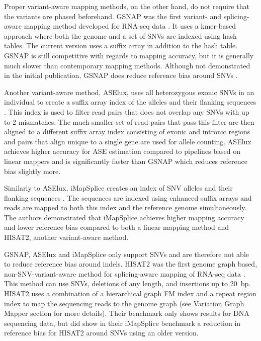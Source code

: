 Proper variant-aware mapping methods, on the other hand, do not require that the variants are phased beforehand.
GSNAP was the first variant- and splicing-aware mapping method developed for RNA-seq data \cite{Wu2010-hv}.
It uses a kmer-based approach where both the genome and a set of SNVs are indexed using hash tables.
The current version uses a suffix array in addition to the hash table.
GSNAP is still competitive with regards to mapping accuracy, but it is generally much slower than contemporary mapping methods.
Although not demonstrated in the initial publication, GSNAP does reduce reference bias around SNVs \cite{Castel2015-ef}.

Another variant-aware method, ASElux, uses all heterozygous exonic SNVs in an individual to create a suffix array index of the alleles and their flanking sequences \cite{Miao2018-ps}. 
This index is used to filter read pairs that does not overlap any SNVs with up to 2 mismatches. 
The much smaller set of read pairs that pass this filter are then aligned to a different suffix array index consisting of exonic and intronic regions and pairs that align unique to a single gene are used for allele counting. 
ASElux achieves higher accuracy for ASE estimation compared to pipelines based on linear mappers and is significantly faster than GSNAP which reduces reference bias slightly more.

Similarly to ASElux, iMapSplice creates an index of SNV alleles and their flanking sequences \cite{Liu_2018}.
The sequences are indexed using enhanced suffix arrays and reads are mapped to both this index and the reference genome simultaneously.
The authors demonstrated that iMapSplice achieves higher mapping accuracy and lower reference bias compared to both a linear mapping method and HISAT2, another variant-aware method.

GSNAP, ASElux and iMapSplice only support SNVs and are therefore not able to reduce reference bias around indels.
HISAT2 was the first genome graph based, non-SNV-variant-aware method for splicing-aware mapping of RNA-seq data \cite{Kim_2019}. 
This method can use SNVs, deletions of any length, and insertions up to 20~bp.
HISAT2 uses a combination of a hierarchical graph FM index and a repeat region index to map the sequencing reads to the genome graph (see Variation Graph Mapper section for more details).
Their benchmark only shows results for DNA sequencing data, but \citeauthor{Liu_2018} did show in their iMapSplice benchmark a reduction in reference bias for HISAT2 around SNVs using an older version.  

